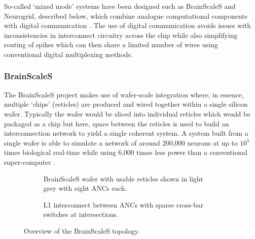 			So-called `mixed mode' systems have been designed such as BrainScaleS and
			Neurogrid, described below, which combine analogue computational
			components with digital communication \cite{maguire07,choudhary12}. The
			use of digital communication avoids issues with inconsistencies in
			interconnect circuitry across the chip while also simplifying routing of
			spikes which can then share a limited number of wires using conventional
			digital multiplexing methods.
			
			\subsubsection{BrainScaleS}
				
				
				The BrainScaleS project makes use of wafer-scale integration where, in
				essence, multiple `chips' (reticles) are produced and wired together
				within a single silicon wafer. Typically the wafer would be sliced into
				individual reticles which would be packaged as a chip but here, space
				between the reticles is used to build an interconnection network to
				yield a single coherent system. A system built from a single wafer is
				able to simulate a network of around 200,000 neurons at up to $10^5$
				times biological real-time while using 6,000 times less power than a
				conventional super-computer \cite{schemmel08}.
				
				\begin{figure}
					\center
					\begin{subfigure}[b]{0.45\textwidth}
						\center
						
						\caption{BrainScaleS wafer with usable reticles shown in light
						grey with eight ANCs each.}
						\label{fig:brainscales-wafer}
					\end{subfigure}
					\hspace{1ex}
					\begin{subfigure}[b]{0.45\textwidth}
						\center
						
						\caption{L1 interconnect between ANCs with sparse cross-bar
						switches at intersections.}
						\label{fig:brainscales-l1}
					\end{subfigure}
					
					\caption{Overview of the BrainScaleS topology.}
					\label{fig:brainscales-topology}
				\end{figure}
				
